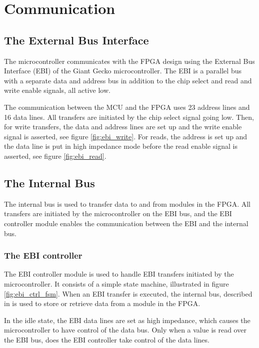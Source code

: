 \FloatBarrier
\section{Communication}\label{section:fpga-buses}

\subsection{The External Bus Interface}
The microcontroller communicates with the FPGA design using the External Bus
Interface (EBI) of the Giant Gecko microcontroller. The EBI is a parallel bus
with a separate data and address bus in addition to the chip select and read and
write enable signals, all active low\cite{efm_ebi}.

The communication between the MCU and the FPGA uses 23 address lines and 16
data lines. All transfers are initiated by the chip select signal going low.
Then, for write transfers, the data and address lines are set up and the
write enable signal is asserted, see figure \ref{fig:ebi_write}. For reads,
the address is set up and the data line is put in high impedance mode before
the read enable signal is asserted, see figure \ref{fig:ebi_read}.




\FloatBarrier
\subsection{The Internal Bus}

The internal bus is used to transfer data to and from modules in the FPGA.
All transfers are initiated by the microcontroller on the EBI bus, and the
EBI controller module enables the communication between the EBI and the
internal bus.

\subsubsection{The EBI controller}
The EBI controller module is used to handle EBI transfers initiated by the
microcontroller. It consists of a simple state machine, illustrated in
figure \ref{fig:ebi_ctrl_fsm}. When an EBI transfer is executed, the
internal bus, described in is used to store or retrieve data from a module
in the FPGA.

In the idle state, the EBI data lines are set as high impedance, which
causes the microcontroller to have control of the data bus. Only when
a value is read over the EBI bus, does the EBI controller take control of
the data lines.

